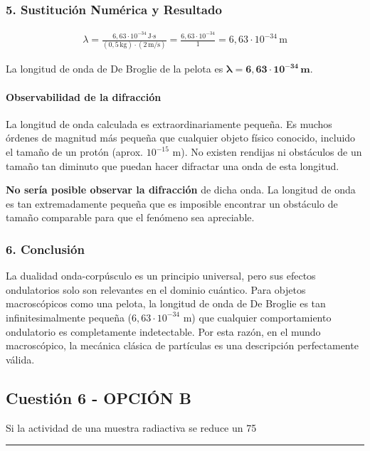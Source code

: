 \subsubsection*{5. Sustitución Numérica y Resultado}
\begin{gather}
    \lambda = \frac{6,63 \cdot 10^{-34}\,\text{J·s}}{(0,5\,\text{kg}) \cdot (2\,\text{m/s})} = \frac{6,63 \cdot 10^{-34}}{1} = 6,63 \cdot 10^{-34} \, \text{m}
\end{gather}
\begin{cajaresultado}
La longitud de onda de De Broglie de la pelota es $\boldsymbol{\lambda = 6,63 \cdot 10^{-34} \, \textbf{m}}$.
\end{cajaresultado}
\paragraph{Observabilidad de la difracción}
La longitud de onda calculada es extraordinariamente pequeña. Es muchos órdenes de magnitud más pequeña que cualquier objeto físico conocido, incluido el tamaño de un protón (aprox. $10^{-15}$ m). No existen rendijas ni obstáculos de un tamaño tan diminuto que puedan hacer difractar una onda de esta longitud.
\begin{cajaresultado}
\textbf{No sería posible observar la difracción} de dicha onda. La longitud de onda es tan extremadamente pequeña que es imposible encontrar un obstáculo de tamaño comparable para que el fenómeno sea apreciable.
\end{cajaresultado}

\subsubsection*{6. Conclusión}
\begin{cajaconclusion}
La dualidad onda-corpúsculo es un principio universal, pero sus efectos ondulatorios solo son relevantes en el dominio cuántico. Para objetos macroscópicos como una pelota, la longitud de onda de De Broglie es tan infinitesimalmente pequeña ($6,63 \cdot 10^{-34}$ m) que cualquier comportamiento ondulatorio es completamente indetectable. Por esta razón, en el mundo macroscópico, la mecánica clásica de partículas es una descripción perfectamente válida.
\end{cajaconclusion}

\newpage

\subsection{Cuestión 6 - OPCIÓN B}
\label{subsec:6B_2010_jun_ord}
\begin{cajaenunciado}
Si la actividad de una muestra radiactiva se reduce un 75%
\end{cajaenunciado}
\hrule

